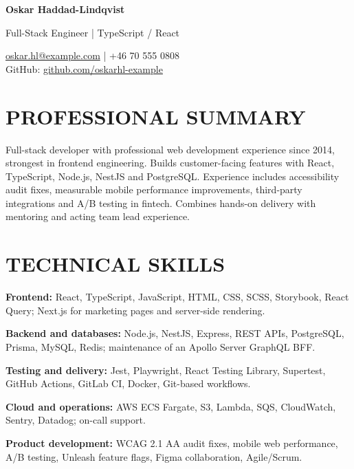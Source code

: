 \documentclass[11pt,a4paper]{article}
\newcommand{\cvsection}[1]{\section*{#1}}
\begin{document}
{\LARGE\bfseries\color{primarycolor} Oskar Haddad-Lindqvist}\par
{\large Full-Stack Engineer | TypeScript / React}\par
\href{mailto:oskar.hl@example.com}{oskar.hl@example.com} | +46 70 555 0808\\
GitHub: \href{https://github.com/oskarhl-example}{github.com/oskarhl-example}

\cvsection{PROFESSIONAL SUMMARY}
Full-stack developer with professional web development experience since 2014, strongest in frontend engineering. Builds customer-facing features with React, TypeScript, Node.js, NestJS and PostgreSQL. Experience includes accessibility audit fixes, measurable mobile performance improvements, third-party integrations and A/B testing in fintech. Combines hands-on delivery with mentoring and acting team lead experience.

\cvsection{TECHNICAL SKILLS}
\textbf{Frontend:} React, TypeScript, JavaScript, HTML, CSS, SCSS, Storybook, React Query; Next.js for marketing pages and server-side rendering.\par
\textbf{Backend and databases:} Node.js, NestJS, Express, REST APIs, PostgreSQL, Prisma, MySQL, Redis; maintenance of an Apollo Server GraphQL BFF.\par
\textbf{Testing and delivery:} Jest, Playwright, React Testing Library, Supertest, GitHub Actions, GitLab CI, Docker, Git-based workflows.\par
\textbf{Cloud and operations:} AWS ECS Fargate, S3, Lambda, SQS, CloudWatch, Sentry, Datadog; on-call support.\par
\textbf{Product development:} WCAG 2.1 AA audit fixes, mobile web performance, A/B testing, Unleash feature flags, Figma collaboration, Agile/Scrum.
\end{document}
